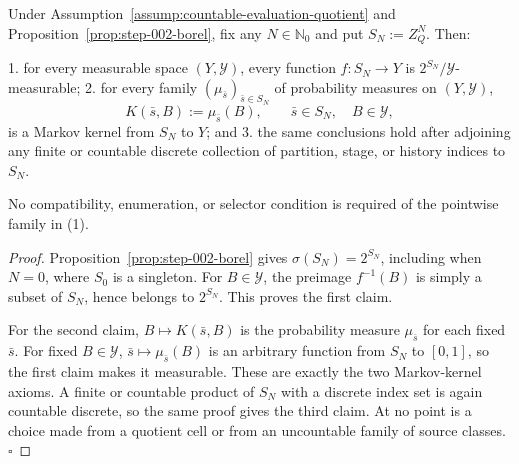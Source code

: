 \begin{lemma}\label{lem:step-003-countable-promotion}
Under Assumption~\ref{assump:countable-evaluation-quotient} and Proposition~\ref{prop:step-002-borel}, fix any
\(N\in\mathbb N_0\) and put \(S_N:=Z_Q^N\). Then:

1. for every measurable space \((Y,\mathcal Y)\), every function
   \(f:S_N\to Y\) is \(2^{S_N}/\mathcal Y\)-measurable;
2. for every family \((\mu_{\bar s})_{\bar s\in S_N}\) of probability
   measures on \((Y,\mathcal Y)\),
   \[
   K(\bar s,B):=\mu_{\bar s}(B),
   \qquad \bar s\in S_N,\quad B\in\mathcal Y,
   \tag{1}
   \]
   is a Markov kernel from \(S_N\) to \(Y\); and
3. the same conclusions hold after adjoining any finite or countable
   discrete collection of partition, stage, or history indices to \(S_N\).

No compatibility, enumeration, or selector condition is required of the
pointwise family in (1).


\end{lemma}

\begin{proof}
Proposition~\ref{prop:step-002-borel} gives
\(\sigma(S_N)=2^{S_N}\), including when \(N=0\), where \(S_0\) is a
singleton. For \(B\in\mathcal Y\), the preimage \(f^{-1}(B)\) is simply a
subset of \(S_N\), hence belongs to \(2^{S_N}\). This proves the first
claim.

For the second claim, \(B\mapsto K(\bar s,B)\) is the probability measure
\(\mu_{\bar s}\) for each fixed \(\bar s\). For fixed \(B\in\mathcal Y\),
\(\bar s\mapsto\mu_{\bar s}(B)\) is an arbitrary function from \(S_N\) to
\([0,1]\), so the first claim makes it measurable. These are exactly the two
Markov-kernel axioms. A finite or countable product of \(S_N\) with a
discrete index set is again countable discrete, so the same proof gives the
third claim. At no point is a choice made from a quotient cell or from an
uncountable family of source classes. \(\square\)


\end{proof}

